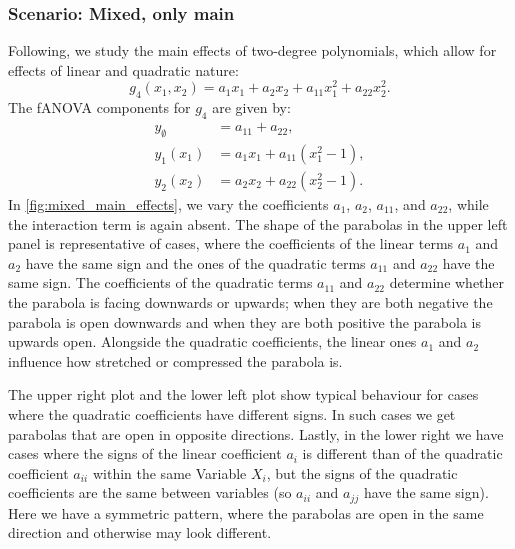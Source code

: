\subsubsection*{Scenario: Mixed, only main}
Following, we study the main effects of two-degree polynomials, which allow for effects of linear and quadratic nature:
\[
g_4(x_1, x_2) = a_1 x_1 + a_2 x_2 + a_{11} x_1^2 + a_{22} x_2^2.
\]
The fANOVA components for $g_4$ are given by:
\begin{align*}
    y_{\emptyset} &= a_{11} + a_{22}, \\
    y_1(x_1) &= a_1 x_1 + a_{11}(x_1^2 - 1), \\
    y_2(x_2) &= a_2 x_2 + a_{22}(x_2^2 - 1).
\end{align*}
In \autoref{fig:mixed_main_effects}, we vary the coefficients $a_1$, $a_2$, $a_{11}$, and $a_{22}$, while the interaction term is again absent.
The shape of the parabolas in the upper left panel is representative of cases, where the coefficients of the linear terms $a_1$ and $a_2$ have the same sign and the ones of the quadratic terms $a_{11}$ and $a_{22}$ have the same sign.
The coefficients of the quadratic terms $a_{11}$ and $a_{22}$ determine whether the parabola is facing downwards or upwards; when they are both negative the parabola is open downwards and when they are both positive the parabola is upwards open. Alongside the quadratic coefficients, the linear ones $a_1$ and $a_2$ influence how stretched or compressed the parabola is.\par
The upper right plot and the lower left plot show typical behaviour for cases where the quadratic coefficients have different signs. In such cases we get parabolas that are open in opposite directions.
Lastly, in the lower right we have cases where the signs of the linear coefficient $a_i$ is different than of the quadratic coefficient $a_{ii}$ within the same Variable $X_i$, but the signs of the quadratic coefficients are the same between variables (so $a_{ii}$ and $a_{jj}$ have the same sign). Here we have a symmetric pattern, where the parabolas are open in the same direction and otherwise may look different.

